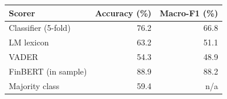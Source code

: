 \begin{tabular}{lrr}
\toprule
Scorer & Accuracy (\%) & Macro-F1 (\%) \\
\midrule
Classifier (5-fold) & 76.2 & 66.8 \\
LM lexicon & 63.2 & 51.1 \\
VADER & 54.3 & 48.9 \\
FinBERT (in sample) & 88.9 & 88.2 \\
Majority class & 59.4 & n/a \\
\bottomrule
\end{tabular}
